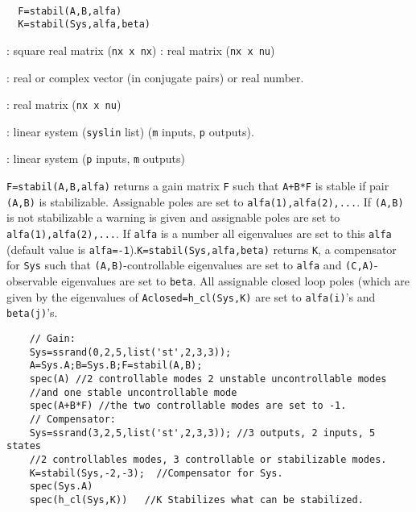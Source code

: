 \begin{mandesc}
   \\ %
\end{mandesc}
\begin{calling_sequence}
\begin{verbatim}
  F=stabil(A,B,alfa)  
  K=stabil(Sys,alfa,beta)  
\end{verbatim}
\end{calling_sequence}
\begin{parameters}
  \begin{varlist}
    : square real matrix (\verb!nx x nx!)
    :  real matrix (\verb!nx x nu!)

    : real or complex vector (in conjugate pairs) or real
    number.

    : real matrix (\verb!nx x nu!)

    : linear system (\verb!syslin! list) (\verb!m! inputs, \verb!p!
    outputs).

    : linear system (\verb!p! inputs, \verb!m! outputs)
  \end{varlist}
\end{parameters}
\begin{mandescription}
  \verb!F=stabil(A,B,alfa)! returns a gain matrix \verb!F! such that
  \verb!A+B*F! is stable if pair \verb!(A,B)! is stabilizable.  Assignable poles
  are set to \verb!alfa(1),alfa(2),...!.  If \verb!(A,B)! is not stabilizable a
  warning is given and assignable poles are set to \verb!alfa(1),alfa(2),...!.
  If \verb!alfa! is a number all eigenvalues are set to this \verb!alfa!
  (default value is \verb!alfa=-1!).\verb!K=stabil(Sys,alfa,beta)! returns
  \verb!K!, a compensator for \verb!Sys!  such that \verb!(A,B)!-controllable
  eigenvalues are set to \verb!alfa! and \verb!(C,A)!-observable eigenvalues are
  set to \verb!beta!.  All assignable closed loop poles (which are given by the
  eigenvalues of \verb!Aclosed=h_cl(Sys,K)! are set to \verb!alfa(i)!'s and
  \verb!beta(j)!'s.
\end{mandescription}
\begin{examples}
  \begin{Verbatim}
    // Gain:
    Sys=ssrand(0,2,5,list('st',2,3,3));
    A=Sys.A;B=Sys.B;F=stabil(A,B);
    spec(A) //2 controllable modes 2 unstable uncontrollable modes
    //and one stable uncontrollable mode
    spec(A+B*F) //the two controllable modes are set to -1.
    // Compensator:
    Sys=ssrand(3,2,5,list('st',2,3,3)); //3 outputs, 2 inputs, 5 states
    //2 controllables modes, 3 controllable or stabilizable modes.
    K=stabil(Sys,-2,-3);  //Compensator for Sys.
    spec(Sys.A)
    spec(h_cl(Sys,K))   //K Stabilizes what can be stabilized.
  \end{Verbatim}
\end{examples}
\begin{manseealso}
      
\end{manseealso}
